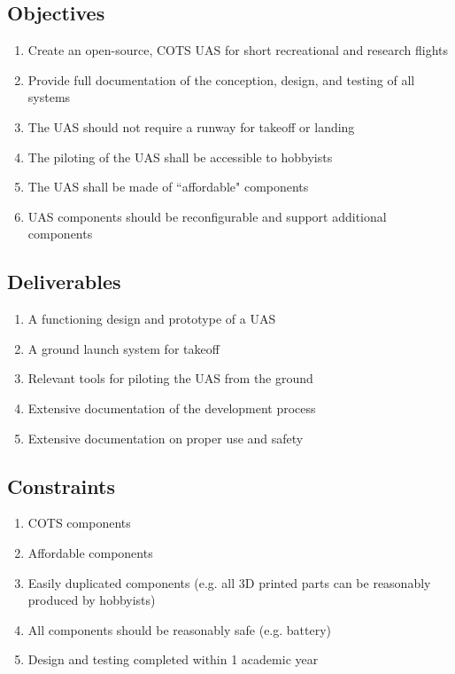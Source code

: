 \documentclass{article}
\begin{document}
\subsection{Objectives}
\begin{enumerate}
\item Create an open-source, COTS UAS for short recreational and research flights
\item Provide full documentation of the conception, design, and testing of all systems
\item The UAS should not require a runway for takeoff or landing
\item The piloting of the UAS shall be accessible to hobbyists
\item The UAS shall be made of ``affordable" components
\item UAS components should be reconfigurable and support additional components
\end{enumerate}

\subsection{Deliverables}
\begin{enumerate}
\item A functioning design and prototype of a UAS
\item A ground launch system for takeoff
\item Relevant tools for piloting the UAS from the ground
\item Extensive documentation of the development process
\item Extensive documentation on proper use and safety
\end{enumerate}

\subsection{Constraints}
\begin{enumerate}
\item COTS components
\item Affordable components
\item Easily duplicated components (e.g. all 3D printed parts can be reasonably produced by hobbyists)
\item All components should be reasonably safe (e.g. battery)
\item Design and testing completed within 1 academic year
\end{enumerate}
\end{document}
